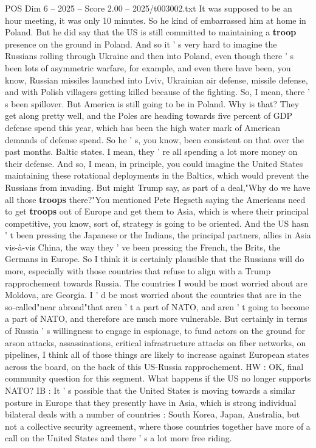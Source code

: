 \begin{textsample}{POS Dim 6 – 2025 – Score 2.00 – 2025/t003002.txt}
It was supposed to be an hour meeting, it was only 10 minutes.
So he kind of embarrassed him at home in Poland.
But he did say that the US is still committed to maintaining a \textbf{troop} presence on the ground in Poland.
And so it ' s very hard to imagine the Russians rolling through Ukraine and then into Poland, even though there ' s been lots of asymmetric warfare, for example, and even there have been, you know, Russian missiles launched into Lviv, Ukrainian air defense, missile defense, and with Polish villagers getting killed because of the fighting.
So, I mean, there ' s been spillover.
But America is still going to be in Poland.
Why is that?
They get along pretty well, and the Poles are heading towards five percent of GDP defense spend this year, which has been the high water mark of American demands of defense spend.
So he ' s, you know, been consistent on that over the past months.
Baltic states.
I mean, they ' re all spending a lot more money on their defense.
And so, I mean, in principle, you could imagine the United States maintaining these rotational deployments in the Baltics, which would prevent the Russians from invading.
But might Trump say, as part of a deal,"Why do we have all those \textbf{troops} there?"You mentioned Pete Hegseth saying the Americans need to get \textbf{troops} out of Europe and get them to Asia, which is where their principal competitive, you know, sort of, strategy is going to be oriented.
And the US hasn ' t been pressing the Japanese or the Indians, the principal partners, allies in Asia vis-à-vis China, the way they ' ve been pressing the French, the Brits, the Germans in Europe.
So I think it is certainly plausible that the Russians will do more, especially with those countries that refuse to align with a Trump rapprochement towards Russia.
The countries I would be most worried about are Moldova, are Georgia.
I ' d be most worried about the countries that are in the so-called"near abroad"that aren ' t a part of NATO, and aren ' t going to become a part of NATO, and therefore are much more vulnerable.
But certainly in terms of Russia ' s willingness to engage in espionage, to fund actors on the ground for arson attacks, assassinations, critical infrastructure attacks on fiber networks, on pipelines, I think all of those things are likely to increase against European states across the board, on the back of this US-Russia rapprochement.
HW : OK, final community question for this segment.
What happens if the US no longer supports NATO?
IB : It ' s possible that the United States is moving towards a similar posture in Europe that they presently have in Asia, which is strong individual bilateral deals with a number of countries : South Korea, Japan, Australia, but not a collective security agreement, where those countries together have more of a call on the United States and there ' s a lot more free riding.

\end{textsample}
